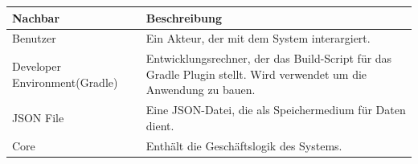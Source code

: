 \begin{longtable}{|m{}|m{}|}
    \hline
    \textbf{Nachbar} & \textbf{Beschreibung}\\
    \hline
    Benutzer & Ein Akteur, der mit dem System interargiert.\\
    \hline
    Developer Environment(Gradle) & Entwicklungsrechner, der das Build-Script für das Gradle Plugin stellt. Wird verwendet um die Anwendung zu bauen.\\
    \hline
     JSON File &  Eine JSON-Datei, die als Speichermedium für Daten dient.\\
    \hline
    Core & Enthält die Geschäftslogik des Systems.\\
    \hline
\end{longtable}